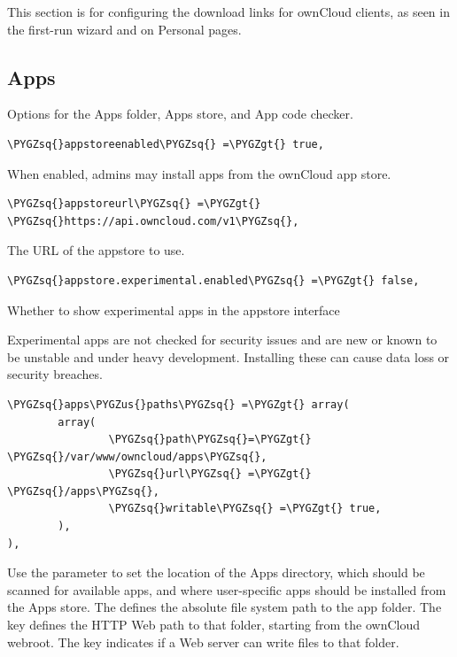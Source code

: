 \documentclass[letterpaper,10pt,english]{sphinxmanual}
\def\PYGZus{\char`\_}
\def\PYGZgt{\char`\>}
\def\PYGZsq{\char`\'}
\begin{document}
This section is for configuring the download links for ownCloud clients, as
seen in the first-run wizard and on Personal pages.


\subsection{Apps}
\label{configuration_server/config_sample_php_parameters:apps}
Options for the Apps folder, Apps store, and App code checker.

\begin{Verbatim}[commandchars=\\\{\}]
\PYGZsq{}appstoreenabled\PYGZsq{} =\PYGZgt{} true,
\end{Verbatim}

When enabled, admins may install apps from the ownCloud app store.

\begin{Verbatim}[commandchars=\\\{\}]
\PYGZsq{}appstoreurl\PYGZsq{} =\PYGZgt{} \PYGZsq{}https://api.owncloud.com/v1\PYGZsq{},
\end{Verbatim}

The URL of the appstore to use.

\begin{Verbatim}[commandchars=\\\{\}]
\PYGZsq{}appstore.experimental.enabled\PYGZsq{} =\PYGZgt{} false,
\end{Verbatim}

Whether to show experimental apps in the appstore interface

Experimental apps are not checked for security issues and are new or known
to be unstable and under heavy development. Installing these can cause data
loss or security breaches.

\begin{Verbatim}[commandchars=\\\{\}]
\PYGZsq{}apps\PYGZus{}paths\PYGZsq{} =\PYGZgt{} array(
        array(
                \PYGZsq{}path\PYGZsq{}=\PYGZgt{} \PYGZsq{}/var/www/owncloud/apps\PYGZsq{},
                \PYGZsq{}url\PYGZsq{} =\PYGZgt{} \PYGZsq{}/apps\PYGZsq{},
                \PYGZsq{}writable\PYGZsq{} =\PYGZgt{} true,
        ),
),
\end{Verbatim}

Use the  parameter to set the location of the Apps directory,
which should be scanned for available apps, and where user-specific apps
should be installed from the Apps store. The  defines the absolute
file system path to the app folder. The key  defines the HTTP Web path
to that folder, starting from the ownCloud webroot. The key 
indicates if a Web server can write files to that folder.
\end{document}
